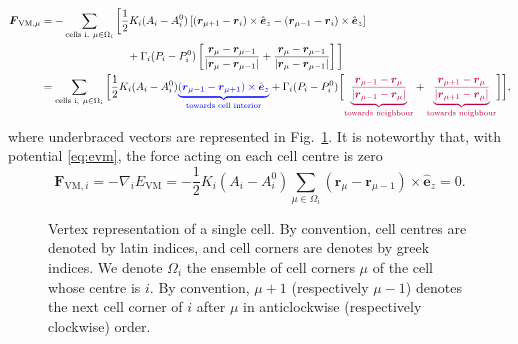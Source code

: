 \documentclass[aps, superscriptaddress, notitlepage]{revtex4-1}
\def\scale{0.8}
\begin{document}
\begin{equation}
\begin{aligned}
\boldsymbol{F}_{\mathrm{VM},\mu} &= - \sum_{\text{cells i},~ \mu \in \Omega_i} \bigg[\frac{1}{2} K_i (A_i - A^0_i) \left[(\boldsymbol{r}_{\mu + 1} - \boldsymbol{r}_i) \times \hat{\boldsymbol{e}}_z - (\boldsymbol{r}_{\mu - 1} - \boldsymbol{r}_i) \times \hat{\boldsymbol{e}}_z\right]\\
&\qquad\qquad\qquad\qquad+ \Gamma_i (P_i - P^0_i) \left[\frac{\boldsymbol{r}_{\mu} - \boldsymbol{r}_{\mu - 1}}{|\boldsymbol{r}_{\mu} - \boldsymbol{r}_{\mu - 1}|} + \frac{\boldsymbol{r}_{\mu} - \boldsymbol{r}_{\mu - 1}}{|\boldsymbol{r}_{\mu} - \boldsymbol{r}_{\mu - 1}|}\right]\bigg]\\
&= \sum_{\text{cells i},~ \mu \in \Omega_i} \bigg[\frac{1}{2} K_i (A_i - A^0_i) {\color{blue} \underbrace{(\boldsymbol{r}_{\mu - 1} - \boldsymbol{r}_{\mu + 1}) \times \hat{\boldsymbol{e}}_z}_{\text{towards cell interior}}} + \Gamma_i (P_i - P^0_i) \bigg[{\color{purple} \underbrace{\frac{\boldsymbol{r}_{\mu - 1} - \boldsymbol{r}_{\mu}}{|\boldsymbol{r}_{\mu - 1} - \boldsymbol{r}_{\mu}|}}_{\text{towards neighbour}}} + {\color{purple} \underbrace{\frac{\boldsymbol{r}_{\mu + 1} - \boldsymbol{r}_{\mu}}{|\boldsymbol{r}_{\mu + 1} - \boldsymbol{r}_{\mu}|}}_{\text{towards neighbour}}}\bigg]\bigg],
\end{aligned}
\end{equation}
where underbraced vectors are represented in Fig.~\ref{fig:fmu}. It is noteworthy that, with potential \eqref{eq:evm}, the force acting on each cell centre is zero
\begin{equation}
\boldsymbol{F}_{\mathrm{VM}, i} = - \nabla_i E_{\mathrm{VM}} = - \frac{1}{2} K_i (A_i - A^0_i) \sum_{\mu \in \Omega_i} (\boldsymbol{r}_{\mu} - \boldsymbol{r}_{\mu - 1}) \times \hat{\boldsymbol{e}}_z = 0.
\end{equation}

\begin{figure}[!t]
\centering
\begin{tikzpicture}[scale=\scale]

\end{tikzpicture}
\caption{Vertex representation of a single cell. By convention, cell centres are denoted by latin indices, and cell corners are denotes by greek indices. We denote $\Omega_i$ the ensemble of cell corners $\mu$ of the cell whose centre is $i$. By convention, $\mu + 1$ (respectively $\mu - 1$) denotes the next cell corner of $i$ after $\mu$ in anticlockwise (respectively clockwise) order.}
\label{fig:fmu}
\end{figure}
\end{document}

